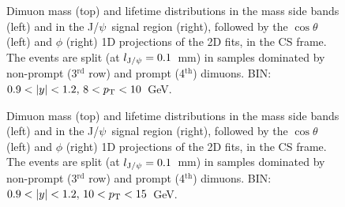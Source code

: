 \documentclass[12pt]{article}
\newcommand{\JPsi}{J/$\psi$}
\begin{document}
\begin{figure}[htbp]
\centering
{}
\caption{Dimuon mass (top) and lifetime distributions in the mass side bands 
(left) and in the \JPsi\ signal region (right), followed by the
$\cos\theta$ (left) and $\phi$ (right) 1D projections of the 2D fits,
in the CS frame. The events are split (at $l_{{\rm J}/\psi} = 0.1$~mm) 
in samples dominated by non-prompt (3$^\mathrm{rd}$ row) and 
prompt (4$^\mathrm{th}$) dimuons. BIN: $0.9 <|y|<1.2,\, 8 < p_{\rm T} < 10$~GeV.}
\end{figure}
\clearpage

\begin{figure}[htbp]
\centering
{}
\caption{Dimuon mass (top) and lifetime distributions in the mass side bands 
(left) and in the \JPsi\ signal region (right), followed by the
$\cos\theta$ (left) and $\phi$ (right) 1D projections of the 2D fits,
in the CS frame. The events are split (at $l_{{\rm J}/\psi} = 0.1$~mm) 
in samples dominated by non-prompt (3$^\mathrm{rd}$ row) and 
prompt (4$^\mathrm{th}$) dimuons. BIN: $0.9 <|y|<1.2,\, 10 < p_{\rm T} < 15$~GeV.}
\end{figure}
\clearpage
\end{document}

